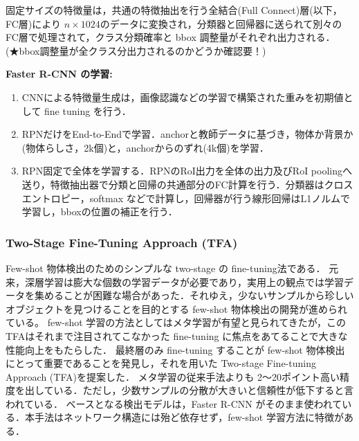 \documentclass[originalpaper]{jsaiart}     %
\begin{document}
固定サイズの特徴量は，共通の特徴抽出を行う全結合(Full Connect)層(以下，FC層)により $n{\times}1024$のデータに変換され，分類器と回帰器に送られて別々のFC層で処理されて，クラス分類確率と bbox 調整量がそれぞれ出力される．(★bbox調整量が全クラス分出力されるのかどうか確認要！)

{\bf Faster R-CNN の学習:\ } 
\begin{enumerate}
    \item CNNによる特徴量生成は，画像認識などの学習で構築された重みを初期値として fine tuning を行う．
    \item RPNだけをEnd-to-Endで学習．anchorと教師データに基づき，物体か背景か(物体らしさ，2k個)と，anchorからのずれ(4k個)を学習．
    \item RPN固定で全体を学習する．RPNのRoI出力を全体の出力及びRoI poolingへ送り，特徴抽出器で分類と回帰の共通部分のFC計算を行う．分類器はクロスエントロピー，softmax などで計算し，回帰器が行う線形回帰はL1ノルムで学習し，bboxの位置の補正を行う．
\end{enumerate}

\subsubsection{Two-Stage Fine-Tuning Approach (TFA)}
Few-shot 物体検出のためのシンプルな two-stage の fine-tuning法である\cite{WHGDY20}．
元来，深層学習は膨大な個数の学習データが必要であり，実用上の観点では学習データを集めることが困難な場合があった．それゆえ，少ないサンプルから珍しいオブジェクトを見つけることを目的とする few-shot 物体検出の開発が進められている。
few-shot 学習の方法としてはメタ学習が有望と見られてきたが，このTFAはそれまで注目されてこなかった fine-tuning に焦点をあてることで大きな性能向上をもたらした．
最終層のみ fine-tuning することが few-shot 物体検出にとって重要であることを発見し，それを用いた Two-stage Fine-tuning Approach (TFA)を提案した．
メタ学習の従来手法よりも 2〜20ポイント高い精度を出している．ただし，少数サンプルの分散が大きいと信頼性が低下すると言われている．
ベースとなる検出モデルは，Faster R-CNN がそのまま使われている．本手法はネットワーク構造には殆ど依存せず，few-shot 学習方法に特徴がある．
\end{document}
